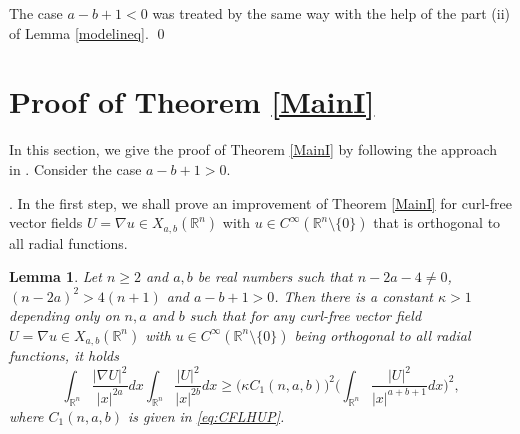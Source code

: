 \documentclass[a4paper,12pt]{article}
\theoremstyle{plain}
\newtheorem{lemma}[theorem]{Lemma}
\theoremstyle{definition}
\theoremstyle{remark}
\def\R{\mathbb R}%
\def\irn{\int_{\R^n}}
\numberwithin{equation}{section}
\begin{document}
The case $a-b + 1 < 0$ was treated by the same way with the help of the part (ii) of Lemma \ref{modelineq}. \qed

\section{Proof of Theorem \ref{MainI}}\label{s4}
In this section, we give the proof of Theorem \ref{MainI} by following the approach in \cite{DNCVPDE}. Consider the case $a -b +1 >0$. 

.  In the first step, we shall prove an improvement of {Theorem \ref{MainI}} for curl-free vector fields $U =\nabla u\in X_{a,b}(\R^n)$ with  $u\in C^\infty(\R^n\setminus\{0\})$ that is orthogonal to all radial functions. 
\begin{lemma}\label{Improved2ndvf}
Let $n\geq 2$ and $a, b$ be real numbers such that $n-2a -4 \not=0$, $(n-2a)^2 > 4(n+1)$ and $a-b +1 >0$. Then there is a constant $\kappa >1$ depending only on $n, a$ and $b$ such that for any curl-free vector field $U =\nabla u\in X_{a,b}(\R^n)$ with $u\in C^\infty(\R^n\setminus\{0\})$ being orthogonal to all radial functions, it holds
\begin{equation*}%
\irn \frac{|\nabla U|^2}{|x|^{2a}} dx \irn \frac{|U|^2}{|x|^{2b}} dx \geq \Big(\kappa C_1(n,a,b)\Big)^2 \Big(\irn \frac{|U|^2}{|x|^{a+b +1}} dx\Big)^2,
\end{equation*}
where $C_1(n,a,b)$ is given in \eqref{eq:CFLHUP}.
\end{lemma}
\end{document}
